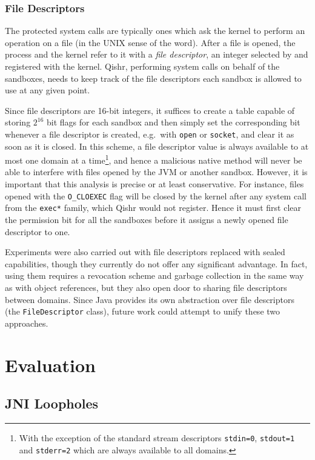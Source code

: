 \documentclass[a4paper,12pt,twoside,openright]{report}
\newcommand{\class}[1]{\texttt{#1}}
\begin{document}
\subsection{File Descriptors}

The protected system calls are typically ones which ask the kernel to perform an operation on a file (in the UNIX sense of the word). After a file is opened, the process and the kernel refer to it with a \emph{file descriptor}, an integer selected by and registered with the kernel. Qishr, performing system calls on behalf of the sandboxes, needs to keep track of the file descriptors each sandbox is allowed to use at any given point.

Since file descriptors are 16-bit integers, it suffices to create a table capable of storing $2^{16}$ bit flags for each sandbox and then simply set the corresponding bit whenever a file descriptor is created, e.g.\ with \texttt{open} or \texttt{socket}, and clear it as soon as it is closed. In this scheme, a file descriptor value is always available to at most one domain at a time\footnote{With the exception of the standard stream descriptors \texttt{stdin=0}, \texttt{stdout=1} and \texttt{stderr=2} which are always available to all domains.}, and hence a malicious native method will never be able to interfere with files opened by the JVM or another sandbox. However, it is important that this analysis is precise or at least conservative. For instance, files opened with the \texttt{O\_CLOEXEC} flag will be closed by the kernel after any system call from the \texttt{exec*} family, which Qishr would not register. Hence it must first clear the permission bit for all the sandboxes before it assigns a newly opened file descriptor to one.

Experiments were also carried out with file descriptors replaced with sealed capabilities, though they currently do not offer any significant advantage. In fact, using them requires a revocation scheme and garbage collection in the same way as with object references, but they also open door to sharing file descriptors between domains. Since Java provides its own abstraction over file descriptors (the \class{FileDescriptor} class), future work could attempt to unify these two approaches.

\chapter{Evaluation} 

\section{JNI Loopholes}
\end{document}
